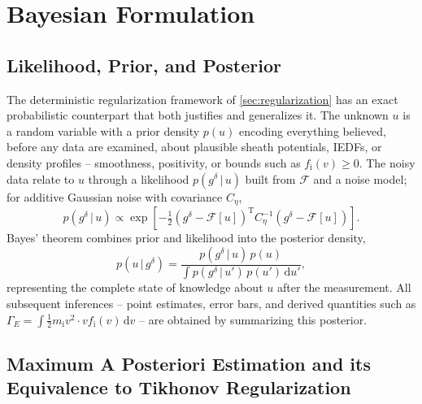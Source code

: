 \section{Bayesian Formulation}
\label{sec:bayesian}

\subsection{Likelihood, Prior, and Posterior}

The deterministic regularization framework of \cref{sec:regularization} has an exact probabilistic counterpart that both justifies and generalizes it. The unknown $u$ is a random variable with a prior density $p(u)$ encoding everything believed, before any data are examined, about plausible sheath potentials, IEDFs, or density profiles -- smoothness, positivity, or bounds such as $f_{\mathrm{i}}(v) \ge 0$. The noisy data relate to $u$ through a likelihood $p(g^{\delta}\,|\,u)$ built from $\mathcal{F}$ and a noise model; for additive Gaussian noise with covariance $C_{\eta}$,
\begin{equation}
p(g^{\delta}\,|\,u) \propto \exp\!\left[ -\tfrac{1}{2} \left( g^{\delta} - \mathcal{F}[u] \right)^{\mathrm{T}} C_{\eta}^{-1} \left( g^{\delta} - \mathcal{F}[u] \right) \right].
\label{ch14-eq:likelihood}
\end{equation}
Bayes' theorem combines prior and likelihood into the posterior density,
\begin{equation}
p(u\,|\,g^{\delta}) = \frac{ p(g^{\delta}\,|\,u)\, p(u) }{ \int p(g^{\delta}\,|\,u')\, p(u')\, \mathrm{d}u' },
\label{eq:bayes}
\end{equation}
representing the complete state of knowledge about $u$ after the measurement. All subsequent inferences -- point estimates, error bars, and derived quantities such as $\Gamma_{E} = \int \tfrac{1}{2} m_{\mathrm{i}} v^{2} \cdot v f_{\mathrm{i}}(v)\, \mathrm{d}v$ -- are obtained by summarizing this posterior.

\subsection{Maximum A Posteriori Estimation and its Equivalence to Tikhonov Regularization}

